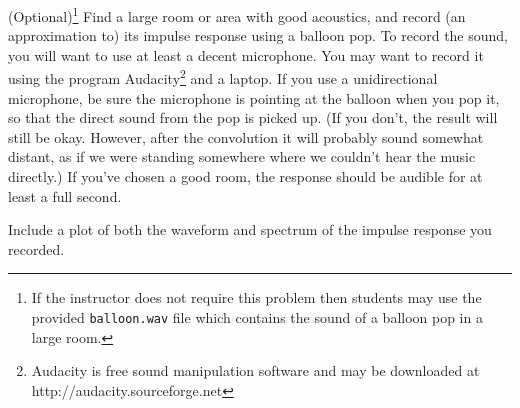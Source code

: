 \begin{problem}
(Optional)\footnote{If the instructor does not require this problem then students may use the provided \texttt{balloon.wav} file which contains the sound of a balloon pop in a large room.} Find a large room or area with good acoustics, and record (an approximation to) its impulse response using a balloon pop.
To record the sound, you will want to use at least a decent microphone.
You may want to record it using the program Audacity\footnote{Audacity is free sound manipulation software and may be downloaded at http://audacity.sourceforge.net} and a laptop.
If you use a unidirectional microphone, be sure the microphone is pointing at the balloon when you pop it, so that the direct sound from the pop is picked up.
(If you don't, the result will still be okay.
However, after the convolution it will probably sound somewhat distant, as if we were standing somewhere where we couldn't hear the music directly.)
If you've chosen a good room, the response should be audible for at least a full second.

Include a plot of both the waveform and spectrum of the impulse response you recorded.
\end{problem}

